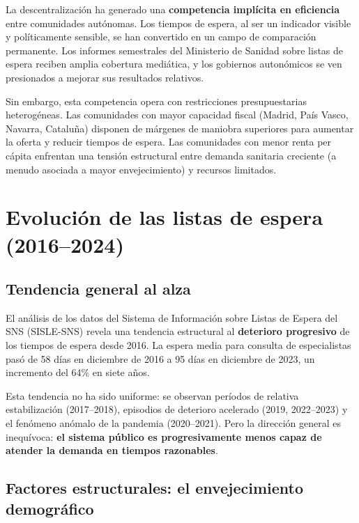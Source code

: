 La descentralización ha generado una \textbf{competencia implícita en eficiencia}
entre comunidades autónomas. Los tiempos de espera, al ser un indicador visible y
políticamente sensible, se han convertido en un campo de comparación permanente.
Los informes semestrales del Ministerio de Sanidad sobre listas de espera reciben
amplia cobertura mediática, y los gobiernos autonómicos se ven presionados a
mejorar sus resultados relativos.

Sin embargo, esta competencia opera con restricciones presupuestarias
heterogéneas. Las comunidades con mayor capacidad fiscal (Madrid, País Vasco,
Navarra, Cataluña) disponen de márgenes de maniobra superiores para aumentar la
oferta y reducir tiempos de espera. Las comunidades con menor renta per cápita
enfrentan una tensión estructural entre demanda sanitaria creciente (a menudo
asociada a mayor envejecimiento) y recursos limitados.

\section{Evolución de las listas de espera (2016--2024)}

\subsection{Tendencia general al alza}

El análisis de los datos del Sistema de Información sobre Listas de Espera del
SNS (SISLE-SNS) revela una tendencia estructural al \textbf{deterioro progresivo}
de los tiempos de espera desde 2016. La espera media para consulta de especialistas
pasó de 58 días en diciembre de 2016 a 95 días en diciembre de 2023, un incremento
del 64\% en siete años.

Esta tendencia no ha sido uniforme: se observan períodos de relativa estabilización
(2017--2018), episodios de deterioro acelerado (2019, 2022--2023) y el fenómeno
anómalo de la pandemia (2020--2021). Pero la dirección general es inequívoca:
\textbf{el sistema público es progresivamente menos capaz de atender la demanda en
tiempos razonables}.

\subsection{Factores estructurales: el envejecimiento demográfico}

